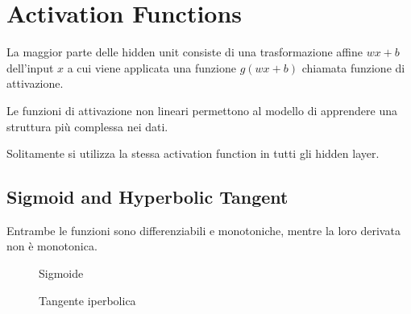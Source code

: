 \chapter{Activation Functions}
La maggior parte delle hidden unit consiste di una trasformazione affine $w x + b$
dell'input $x$ a cui viene applicata una funzione $g(w x + b)$ chiamata funzione di attivazione.

Le funzioni di attivazione non lineari permettono al modello di apprendere una struttura più complessa nei dati.

Solitamente si utilizza la stessa activation function in tutti gli hidden layer.

\section{Sigmoid and Hyperbolic Tangent}
Entrambe le funzioni sono differenziabili e monotoniche, mentre la loro derivata non è monotonica.

\begin{figure}
  \centering
  \begin{minipage}{0.46\linewidth}
    \caption{Sigmoide}
  \end{minipage}
  \hfill
  \begin{minipage}{0.46\linewidth}
    \caption{Tangente iperbolica}
  \end{minipage}
\end{figure}

